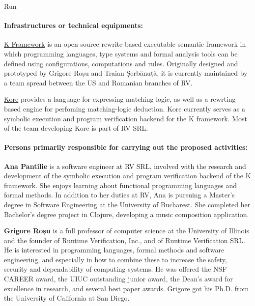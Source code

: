 \begin{sitedescription}{Run}
\paragraph*{Infrastructures or technical equipments:}


\begin{compactitem}
\item \href{https://github.com/kframework/k}{K Framework} is an open source
 rewrite-based executable semantic framework in which programming languages,
 type systems and formal analysis tools can be defined using configurations,
 computations and rules. Originally designed and prototyped by Grigore Roșu and 
 Traian Șerbănuță, it is currently maintained by a team spread between the US and 
 Romanian branches of RV. 
\item \href{https://github.com/kframework/kore}{Kore} provides a language for
expressing matching logic, as well as a rewrting-based engine for perfoming 
matching-logic deduction.  Kore currently serves as a symbolic execution and 
program verification backend for the K framework. Most of the team developing Kore
is part of RV SRL.
\end{compactitem}

\paragraph*{Persons primarily responsible for carrying out the proposed activities:}

\begin{compactitem} %

\item{\bf Ana Pantilie} is a software engineer at RV SRL, involved with the
research and development of the symbolic execution and program verification
backend of the K framework.
She enjoys learning about functional programming languages and formal methods.
In addition to her duties at RV, Ana is pursuing a Master's degree in Software
Engineering at the University of Bucharest.
She completed her Bachelor's degree project in Clojure, developing a music
composition application.

\item{\bf Grigore Roșu} is a full professor of computer science at the
University of Illinois and the founder of Runtime Verification, Inc., and of 
Runtime Verification SRL. He is interested in programming languages,
formal methods and software engineering, and especially in how to combine
these to increase the safety, security and dependability of computing systems.
He was offered the NSF CAREER award, the UIUC outstanding junior award,
the Dean's award for excellence in research, and several best paper awards.
Grigore got his Ph.D. from the University of California at San Diego.


\end{compactitem}
\end{sitedescription}
